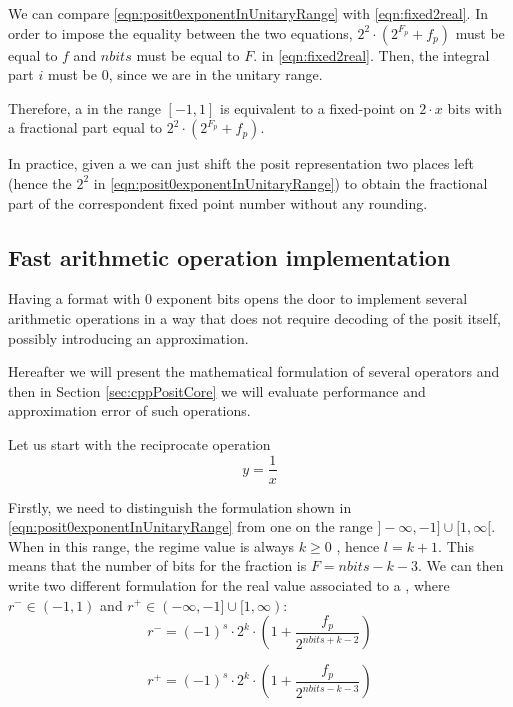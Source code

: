 We can compare \eqref{eqn:posit0exponentInUnitaryRange} with \eqref{eqn:fixed2real}. In order to impose the equality between the two equations, $2^2 \cdot ( 2^{F_p} + f_p )$ must be equal to $f$ and $nbits$ must be equal to $F$. in \eqref{eqn:fixed2real}. Then, the integral part $i$ must be 0, since we are in the unitary range.

Therefore,  a  in the range $[-1,1]$ is equivalent to a fixed-point on $2\cdot x$ bits with a fractional part equal to $2^2 \cdot ( 2^{F_p} + f_p )$.

In practice, given a  we can just shift the posit representation two places left (hence the $2^2$ in \eqref{eqn:posit0exponentInUnitaryRange}) to obtain the fractional part of the correspondent fixed point number without any rounding.


\subsection{Fast arithmetic operation implementation
}

Having a format with $0$ exponent bits opens the door to implement several arithmetic operations in a way that does not require decoding of the posit itself, possibly introducing an approximation.

Hereafter we will present the mathematical formulation of several operators and then in Section \ref{sec:cppPositCore} we will evaluate performance and approximation error of such operations.

Let us start with the reciprocate operation \begin{equation}
    y = \frac{1}{x}
\end{equation}

Firstly, we need to distinguish the formulation shown in \eqref{eqn:posit0exponentInUnitaryRange} from one on the range  $]-\infty,-1] \cup [1,\infty[$. When in this range, the regime value is always $k \geq 0$ ,  hence $l = k + 1$. This means that the number of bits for the fraction is $F = nbits - k - 3$. We can then write two different formulation for the real value associated to a , where $r^- \in (-1,1)$ and $r^+ \in (-\infty, -1] \cup [1,\infty)$:
\begin{equation}
   r^- =  (-1)^s \cdot 2^k \cdot \left ( 1 + \frac{f_p}{2^{nbits + k - 2}} \right )
\end{equation}

\begin{equation}
   r^+ = (-1)^s \cdot 2^k \cdot \left ( 1 + \frac{f_p}{2^{nbits - k - 3}} \right )
\end{equation}

